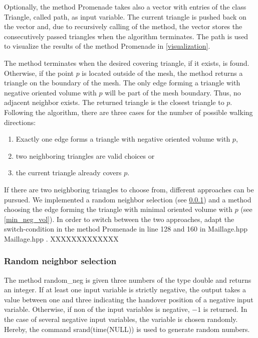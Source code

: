 \documentclass[10pt]{article}
\begin{document}
Optionally, the method {\ttfamily Promenade} takes also a vector with entries of the class {\ttfamily Triangle}, called {\ttfamily path}, as input variable. The current triangle is pushed back on the vector and, due to recursively calling of the method, the vector stores the consecutively passed triangles when the algorithm terminates. The path is used to visualize the results of the method {\ttfamily Promenade} in \ref{visualization}.

The method terminates when the desired covering triangle, if it exists, is found. Otherwise, if the point $p$ is located outside of the mesh, the method returns a triangle on the boundary of the mesh. The only edge forming a triangle with negative oriented volume with $p$ will be part of the mesh boundary. Thus, no adjacent neighbor exists. The returned triangle is the closest triangle to $p$.\\

Following the algorithm, there are three cases for the number of possible walking directions:
\begin{enumerate}
	\item Exactly one edge forms a triangle with negative oriented volume with $p$,
	\item two neighboring triangles are valid choices or
	\item the current triangle already covers $p$.
\end{enumerate}
If there are two neighboring triangles to choose from, different approaches can be pursued. We implemented a random neighbor selection (see \ref{ran_neighb_sel}) and a method choosing the edge forming the triangle with minimal oriented volume with $p$ (see \ref{min_neg_vol}). In order to switch between the two approaches, adapt the switch-condition in the method {\ttfamily Promenade} in line 128 and 160 in Maillage.hpp {\ttfamily Maillage.hpp }. XXXXXXXXXXXXX

\subsubsection{Random neighbor selection} \label{ran_neighb_sel}

The method {\ttfamily random\_neg} is given three numbers of the type {\ttfamily double} and returns an integer. If at least one input variable is strictly negative, the output takes a value between one and three indicating the handover position of a negative input variable. Otherwise, if non of the input variables is negative, $-1$ is returned. In the case of several negative input variables, the variable is chosen randomly. Hereby, the command {\ttfamily srand(time(NULL))} is used to generate random numbers.
\end{document}
